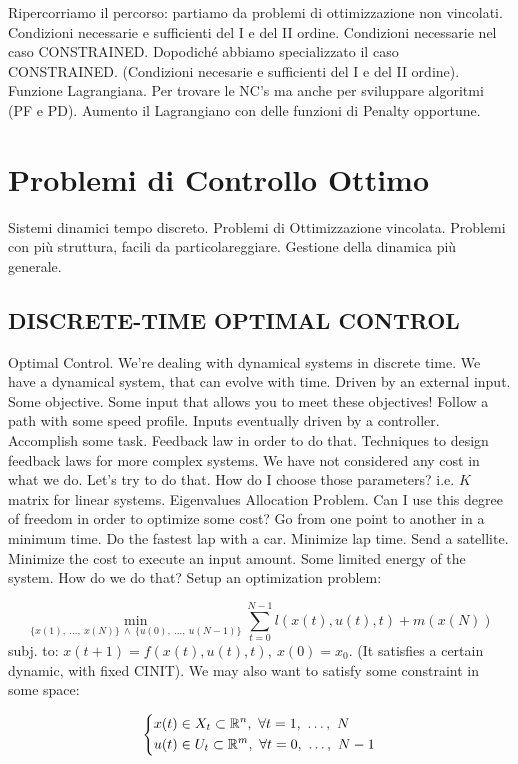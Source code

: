 Ripercorriamo il percorso: partiamo da problemi di ottimizzazione non vincolati. Condizioni necessarie e sufficienti del I e del II ordine. Condizioni necessarie nel caso CONSTRAINED. Dopodiché abbiamo specializzato il caso CONSTRAINED. (Condizioni necesarie e sufficienti del I e del II ordine). Funzione Lagrangiana. Per trovare le NC's ma anche per sviluppare algoritmi (PF e PD). Aumento il Lagrangiano con delle funzioni di Penalty opportune.

\section{Problemi di Controllo Ottimo}

Sistemi dinamici tempo discreto. Problemi di Ottimizzazione vincolata. Problemi con più struttura, facili da particolareggiare. Gestione della dinamica più generale.

\subsection{DISCRETE-TIME OPTIMAL CONTROL}

Optimal Control. We're dealing with dynamical systems in discrete time. We have a dynamical system, that can evolve with time. Driven by an external input. Some objective. Some input that allows you to meet these objectives! Follow a path with some speed profile. Inputs eventually driven by a controller. Accomplish some task. Feedback law in order to do that. Techniques to design feedback laws for more complex systems. We have not considered any cost in what we do. Let's try to do that. How do I choose those parameters? i.e. $K$ matrix for linear systems. Eigenvalues Allocation Problem. Can I use this degree of freedom in order to optimize some cost? Go from one point to another in a minimum time. Do the fastest lap with a car. Minimize lap time. Send a satellite. Minimize the cost to execute an input amount. Some limited energy of the system. How do we do that? Setup an optimization problem:

\[
	\min_{\{x(1),\ \dots,\ x(N)\}\ \land\ \{u(0),\ \dots,\ u(N-1)\}}{\sum_{t=0}^{N-1}{l(x(t),u(t),t)} + m(x(N))}
\]
subj. to: $x(t+1)=f(x(t),u(t),t),\ x(0)=x_0$. (It satisfies a certain dynamic, with fixed CINIT). We may also want to satisfy some constraint in some space:

\[
	\left\{ 
	\begin{aligned}
	&x(t)\in X_t\subset\mathbb{R}^n,\ \forall t=1,\ \dots,\ N\\
	&u(t)\in U_t\subset\mathbb{R}^m,\ \forall t=0,\ \dots,\ N-1
	\end{aligned}
	\right.
\]	


